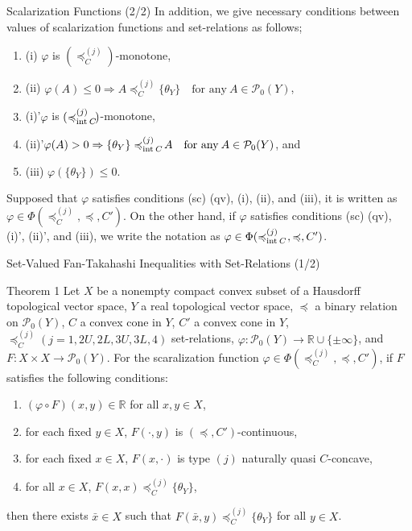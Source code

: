 \documentclass[aspectratio=169, dvipdfmx, 11pt]{beamer}
\newcommand{\rnum}{\mathbb{R}}
\newcommand{\Interior}[1]{\text{\rm int\:${#1}$}} %
\newcommand{\pow}[1]{\mathcal{P}_{0}(#1)}
\newcommand{\setrel}[2]{\preccurlyeq^{(#1)}_{#2}\!}
\begin{document}
\begin{frame}{Scalarization Functions (2/2)}
  In addition, we give necessary conditions between values of
  scalarization functions and set-relations as follows;
  \begin{enumerate}[]
    \item (i) $\varphi$ is $(\setrel{j}{C})$-monotone,
    \item (ii) $\varphi (A) \leq 0 \Rightarrow  A \setrel{j}{C} \{\theta_Y\}\quad\text{for any}\:A\in \pow{Y}$,
    \item (i)'$\varphi$ is $(\setrel{j}{\Interior{C}})$-monotone,
    \item (ii)'$\varphi (A) > 0 \Rightarrow  \{\theta_Y\} \setrel{j}{\Interior{C}} A \quad\text{for any}\:A\in \pow{Y}$, and
    \item (iii) $\varphi(\{\theta_{Y}\}) \leq 0$.
  \end{enumerate}
  Supposed that $\varphi$ satisfies conditions (sc) (qv), (i), (ii), and (iii),
  it is written as $\varphi \in \Phi(\setrel{j}{C}, \preccurlyeq, C')$. On the other hand,
  if $\varphi$ satisfies conditions (sc) (qv), (i)', (ii)', and (iii),
  we write the notation as $\varphi \in \Phi(\setrel{j}{\Interior{C}}\:, \preccurlyeq, C')$.
\end{frame}

\begin{frame}{Set-Valued Fan-Takahashi Inequalities with Set-Relations (1/2)}
  \begin{block}{Theorem 1}
    Let $X$ be a nonempty compact convex subset of a Hausdorff topological vector space,
    $Y$ a real topological vector space, $\preccurlyeq$ a binary relation on $\pow{Y}$,
    $C$ a convex cone in $Y$, $C'$ a convex cone in $Y$,
    $\setrel{j}{C} (j= 1, 2U, 2L, 3U, 3L, 4)$ set-relations,
    $\varphi\colon \pow{Y} \to \rnum \cup \{\pm \infty\}$,
    and $F\colon X \times X \to \pow{Y}$.
    For the scaralization function $\varphi \in \Phi(\setrel{j}{C}, \preccurlyeq, C')$,
    if $F$ satisfies the following conditions:
    \begin{enumerate}
      \item $(\varphi \circ F)(x,y) \in \rnum$ for all $x,y \in X$,
      \item for each fixed $y \in X$, $F(\cdot,y)$ is $(\preccurlyeq, C')$-continuous,
      \item for each fixed $x \in X$, $F(x,\cdot)$ is type $(j)$ naturally quasi $C$-concave,
      \item for all $x \in X$, $F(x,x) \setrel{j}{C} \{\theta_Y\}$,
    \end{enumerate}
    then there exists $\bar{x} \in X$ such that $ F(\bar{x},y) \setrel{j}{C} \{\theta_Y\} $ for all $y \in X$.
  \end{block}
\end{frame}
\end{document}
